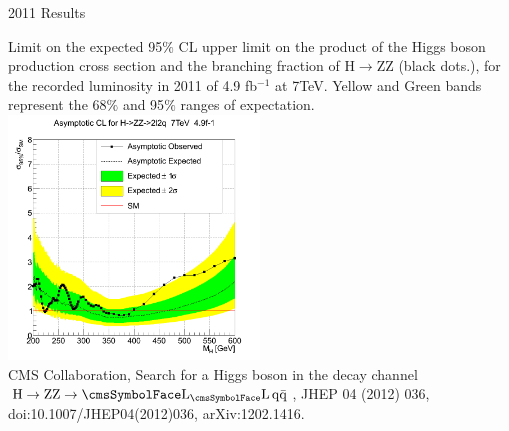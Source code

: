 \begin{frame}{2011 Results}
\begin{center}
\scriptsize
Limit on the expected 95$\%$ CL upper limit on the product of the Higgs boson production cross section and the branching fraction of H$\rightarrow$ZZ (black dots.), for the recorded luminosity in 2011 of 4.9 fb$^{-1}$ at 7TeV. Yellow and Green bands represent the 68$\%$ and 95$\%$ ranges of expectation.
\includegraphics[width=0.5\textwidth]{images/plots/ASCL_7TEV_unblided_new230_new_xsec.png}\\
CMS Collaboration, Search for a Higgs boson in the decay channel $\Htollqq$, JHEP 04 (2012) 036, doi:10.1007/JHEP04(2012)036, arXiv:1202.1416.
\end{center}
\end{frame}



